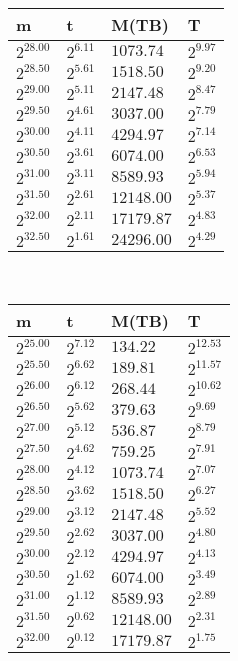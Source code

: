 \begin{tabular}{llll}
m & t & M(TB) & T \\ \hline
$2^{28.00}$ & $2^{6.11}$ & $1073.74$ & $2^{9.97}$ \\
$2^{28.50}$ & $2^{5.61}$ & $1518.50$ & $2^{9.20}$ \\
$2^{29.00}$ & $2^{5.11}$ & $2147.48$ & $2^{8.47}$ \\
$2^{29.50}$ & $2^{4.61}$ & $3037.00$ & $2^{7.79}$ \\
$2^{30.00}$ & $2^{4.11}$ & $4294.97$ & $2^{7.14}$ \\
$2^{30.50}$ & $2^{3.61}$ & $6074.00$ & $2^{6.53}$ \\
$2^{31.00}$ & $2^{3.11}$ & $8589.93$ & $2^{5.94}$ \\
$2^{31.50}$ & $2^{2.61}$ & $12148.00$ & $2^{5.37}$ \\
$2^{32.00}$ & $2^{2.11}$ & $17179.87$ & $2^{4.83}$ \\
$2^{32.50}$ & $2^{1.61}$ & $24296.00$ & $2^{4.29}$ \\
\end{tabular}
 \ 
\begin{tabular}{llll}
m & t & M(TB) & T \\ \hline
$2^{25.00}$ & $2^{7.12}$ & $134.22$ & $2^{12.53}$ \\
$2^{25.50}$ & $2^{6.62}$ & $189.81$ & $2^{11.57}$ \\
$2^{26.00}$ & $2^{6.12}$ & $268.44$ & $2^{10.62}$ \\
$2^{26.50}$ & $2^{5.62}$ & $379.63$ & $2^{9.69}$ \\
$2^{27.00}$ & $2^{5.12}$ & $536.87$ & $2^{8.79}$ \\
$2^{27.50}$ & $2^{4.62}$ & $759.25$ & $2^{7.91}$ \\
$2^{28.00}$ & $2^{4.12}$ & $1073.74$ & $2^{7.07}$ \\
$2^{28.50}$ & $2^{3.62}$ & $1518.50$ & $2^{6.27}$ \\
$2^{29.00}$ & $2^{3.12}$ & $2147.48$ & $2^{5.52}$ \\
$2^{29.50}$ & $2^{2.62}$ & $3037.00$ & $2^{4.80}$ \\
$2^{30.00}$ & $2^{2.12}$ & $4294.97$ & $2^{4.13}$ \\
$2^{30.50}$ & $2^{1.62}$ & $6074.00$ & $2^{3.49}$ \\
$2^{31.00}$ & $2^{1.12}$ & $8589.93$ & $2^{2.89}$ \\
$2^{31.50}$ & $2^{0.62}$ & $12148.00$ & $2^{2.31}$ \\
$2^{32.00}$ & $2^{0.12}$ & $17179.87$ & $2^{1.75}$ \\
\end{tabular}
